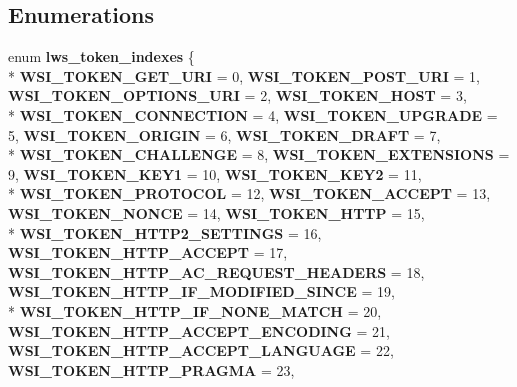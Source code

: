 \subsection*{Enumerations}
\begin{DoxyCompactItemize}
\item 
enum {\bfseries lws\+\_\+token\+\_\+indexes} \{ \\*
{\bfseries W\+S\+I\+\_\+\+T\+O\+K\+E\+N\+\_\+\+G\+E\+T\+\_\+\+U\+RI} = 0, 
{\bfseries W\+S\+I\+\_\+\+T\+O\+K\+E\+N\+\_\+\+P\+O\+S\+T\+\_\+\+U\+RI} = 1, 
{\bfseries W\+S\+I\+\_\+\+T\+O\+K\+E\+N\+\_\+\+O\+P\+T\+I\+O\+N\+S\+\_\+\+U\+RI} = 2, 
{\bfseries W\+S\+I\+\_\+\+T\+O\+K\+E\+N\+\_\+\+H\+O\+ST} = 3, 
\\*
{\bfseries W\+S\+I\+\_\+\+T\+O\+K\+E\+N\+\_\+\+C\+O\+N\+N\+E\+C\+T\+I\+ON} = 4, 
{\bfseries W\+S\+I\+\_\+\+T\+O\+K\+E\+N\+\_\+\+U\+P\+G\+R\+A\+DE} = 5, 
{\bfseries W\+S\+I\+\_\+\+T\+O\+K\+E\+N\+\_\+\+O\+R\+I\+G\+IN} = 6, 
{\bfseries W\+S\+I\+\_\+\+T\+O\+K\+E\+N\+\_\+\+D\+R\+A\+FT} = 7, 
\\*
{\bfseries W\+S\+I\+\_\+\+T\+O\+K\+E\+N\+\_\+\+C\+H\+A\+L\+L\+E\+N\+GE} = 8, 
{\bfseries W\+S\+I\+\_\+\+T\+O\+K\+E\+N\+\_\+\+E\+X\+T\+E\+N\+S\+I\+O\+NS} = 9, 
{\bfseries W\+S\+I\+\_\+\+T\+O\+K\+E\+N\+\_\+\+K\+E\+Y1} = 10, 
{\bfseries W\+S\+I\+\_\+\+T\+O\+K\+E\+N\+\_\+\+K\+E\+Y2} = 11, 
\\*
{\bfseries W\+S\+I\+\_\+\+T\+O\+K\+E\+N\+\_\+\+P\+R\+O\+T\+O\+C\+OL} = 12, 
{\bfseries W\+S\+I\+\_\+\+T\+O\+K\+E\+N\+\_\+\+A\+C\+C\+E\+PT} = 13, 
{\bfseries W\+S\+I\+\_\+\+T\+O\+K\+E\+N\+\_\+\+N\+O\+N\+CE} = 14, 
{\bfseries W\+S\+I\+\_\+\+T\+O\+K\+E\+N\+\_\+\+H\+T\+TP} = 15, 
\\*
{\bfseries W\+S\+I\+\_\+\+T\+O\+K\+E\+N\+\_\+\+H\+T\+T\+P2\+\_\+\+S\+E\+T\+T\+I\+N\+GS} = 16, 
{\bfseries W\+S\+I\+\_\+\+T\+O\+K\+E\+N\+\_\+\+H\+T\+T\+P\+\_\+\+A\+C\+C\+E\+PT} = 17, 
{\bfseries W\+S\+I\+\_\+\+T\+O\+K\+E\+N\+\_\+\+H\+T\+T\+P\+\_\+\+A\+C\+\_\+\+R\+E\+Q\+U\+E\+S\+T\+\_\+\+H\+E\+A\+D\+E\+RS} = 18, 
{\bfseries W\+S\+I\+\_\+\+T\+O\+K\+E\+N\+\_\+\+H\+T\+T\+P\+\_\+\+I\+F\+\_\+\+M\+O\+D\+I\+F\+I\+E\+D\+\_\+\+S\+I\+N\+CE} = 19, 
\\*
{\bfseries W\+S\+I\+\_\+\+T\+O\+K\+E\+N\+\_\+\+H\+T\+T\+P\+\_\+\+I\+F\+\_\+\+N\+O\+N\+E\+\_\+\+M\+A\+T\+CH} = 20, 
{\bfseries W\+S\+I\+\_\+\+T\+O\+K\+E\+N\+\_\+\+H\+T\+T\+P\+\_\+\+A\+C\+C\+E\+P\+T\+\_\+\+E\+N\+C\+O\+D\+I\+NG} = 21, 
{\bfseries W\+S\+I\+\_\+\+T\+O\+K\+E\+N\+\_\+\+H\+T\+T\+P\+\_\+\+A\+C\+C\+E\+P\+T\+\_\+\+L\+A\+N\+G\+U\+A\+GE} = 22, 
{\bfseries W\+S\+I\+\_\+\+T\+O\+K\+E\+N\+\_\+\+H\+T\+T\+P\+\_\+\+P\+R\+A\+G\+MA} = 23, 

\end{DoxyCompactItemize}
